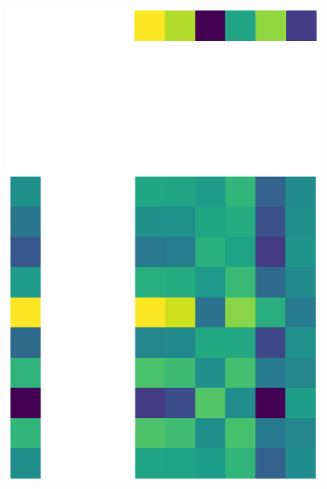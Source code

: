 \documentclass[10pt,twocolumn]{article}
\begin{document}
\begin{figure}[H]
\begin{subfigure}[t]{.15\textwidth}
\centering
\includegraphics[scale=.2]{DWGs/random-matrix-reconstruction-PCs-1.eps}
\caption{ }
\end{subfigure}
\begin{subfigure}[t]{.15\textwidth}
\centering

\end{subfigure}
\end{figure}
\end{document}
